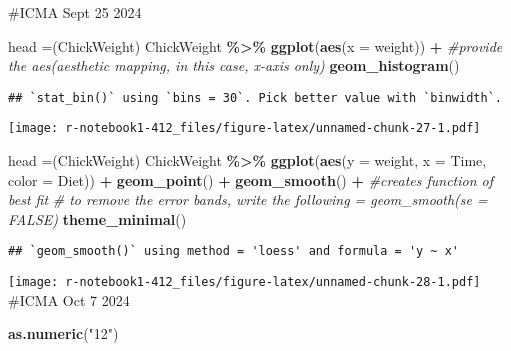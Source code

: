 \documentclass[
]{article}
\newenvironment{Shaded}{\begin{snugshade}}{\end{snugshade}}
\newcommand{\AttributeTok}[1]{\textcolor[rgb]{0.13,0.29,0.53}{#1}}
\newcommand{\CommentTok}[1]{\textcolor[rgb]{0.56,0.35,0.01}{\textit{#1}}}
\newcommand{\FunctionTok}[1]{\textcolor[rgb]{0.13,0.29,0.53}{\textbf{#1}}}
\newcommand{\NormalTok}[1]{#1}
\newcommand{\OtherTok}[1]{\textcolor[rgb]{0.56,0.35,0.01}{#1}}
\newcommand{\SpecialCharTok}[1]{\textcolor[rgb]{0.81,0.36,0.00}{\textbf{#1}}}
\newcommand{\StringTok}[1]{\textcolor[rgb]{0.31,0.60,0.02}{#1}}
\begin{document}
\#ICMA Sept 25 2024

\begin{Shaded}
\begin{Highlighting}[]
\NormalTok{head }\OtherTok{=}\NormalTok{(ChickWeight)}
\NormalTok{ChickWeight }\SpecialCharTok{\%\textgreater{}\%}
  \FunctionTok{ggplot}\NormalTok{(}\FunctionTok{aes}\NormalTok{(}\AttributeTok{x =}\NormalTok{ weight)) }\SpecialCharTok{+} \CommentTok{\#provide the aes(aesthetic mapping, in this case, x{-}axis only)}
\FunctionTok{geom\_histogram}\NormalTok{()}
\end{Highlighting}
\end{Shaded}

\begin{verbatim}
## `stat_bin()` using `bins = 30`. Pick better value with `binwidth`.
\end{verbatim}

\texttt{[image: r-notebook1-412\_files/figure-latex/unnamed-chunk-27-1.pdf]}

\begin{Shaded}
\begin{Highlighting}[]
\NormalTok{head }\OtherTok{=}\NormalTok{(ChickWeight)}
\NormalTok{ChickWeight }\SpecialCharTok{\%\textgreater{}\%}
  \FunctionTok{ggplot}\NormalTok{(}\FunctionTok{aes}\NormalTok{(}\AttributeTok{y =}\NormalTok{ weight, }
             \AttributeTok{x =}\NormalTok{ Time,}
             \AttributeTok{color =}\NormalTok{ Diet)) }\SpecialCharTok{+} 
  \FunctionTok{geom\_point}\NormalTok{() }\SpecialCharTok{+}
  \FunctionTok{geom\_smooth}\NormalTok{() }\SpecialCharTok{+}
\CommentTok{\#creates function of best fit}
\CommentTok{\# to remove the error bands, write the following = geom\_smooth(se = FALSE)}
\FunctionTok{theme\_minimal}\NormalTok{()}
\end{Highlighting}
\end{Shaded}

\begin{verbatim}
## `geom_smooth()` using method = 'loess' and formula = 'y ~ x'
\end{verbatim}

\texttt{[image: r-notebook1-412\_files/figure-latex/unnamed-chunk-28-1.pdf]}
\#ICMA Oct 7 2024

\begin{Shaded}
\begin{Highlighting}[]
\FunctionTok{as.numeric}\NormalTok{(}\StringTok{"12"}\NormalTok{)}
\end{Highlighting}
\end{Shaded}
\end{document}
